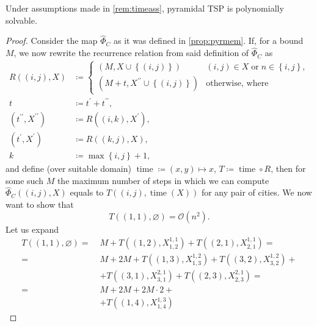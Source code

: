 \documentclass[titlepage,twoside,index=totoc,bibliography=totoc]{scrartcl}
\numberwithin{equation}{section}
\numberwithin{figure}{section}
\numberwithin{table}{section}
\begin{document}
\begin{corollary}
\label{cor:pyrtime}
  Under assumptions made in \cref{rem:timeass},
  pyramidal TSP is polynomially solvable.
\end{corollary}
\begin{proof}
  Consider the map $\widehat{\Phi}_C$ as it was defined in \cref{prop:pyrmem}.
  If, for a bound $M$, we now rewrite the recurrence relation from
  said definition of $\widehat{\Phi}_C$ as
  \begin{align}
    \label{eq:pyrtime}
    R\left((i,j),X\right) & \coloneqq
    \begin{cases}
      \left(M,X \cup \left\{(i,j)\right\}\right) & (i,j) \in X \;\text{or}\; n \in \left\{i,j\right\},
      \\
      \left(M+t,X^{\prime\prime} \cup \left\{(i,j)\right\}\right) & \text{otherwise, where}
    \end{cases}
    \\
    t & \coloneqq t^{\prime} + t^{\prime\prime},
    \nonumber
    \\
    \left(t^{\prime\prime},X^{\prime\prime}\right) & \coloneqq R\left((i,k),X^\prime\right),
    \nonumber
    \\
    \left(t^{\prime},X^{\prime}\right) & \coloneqq R\left((k,j),X\right),
    \nonumber
    \\
    k & \coloneqq \max \left\{i,j\right\} + 1,
    \nonumber
  \end{align}
  and define (over suitable domain)
  $\operatorname{time} \coloneqq (x,y) \mapsto x$,
  $T \coloneqq \operatorname{time} \circ R$,
  then for some such $M$
  the maximum number of steps in which we can compute
  $\widehat{\Phi}_C\left((i,j),X\right)$
  equals to
  $T\left((i,j),\operatorname{time}\left(X\right)\right)$
  for any pair of cities.
  We now want to show that
  \[
    T\left((1,1),\varnothing\right) = \mathcal{O}\left(n^2\right).
  \]
  Let us expand
  \begin{align*}
    T\left((1,1),\varnothing\right) =\; &
    M + T\left((1,2),X_{1,2}^{1,1}\right)
      + T\left((2,1),X_{2,1}^{1,1}\right) =
    \\ =\; & M + 2M + T\left((1,3),X_{1,3}^{1,2}\right)
                  + T\left((3,2),X_{3,2}^{1,2}\right) +
             \\ & + T\left((3,1),X_{3,1}^{2,1}\right)
                  + T\left((2,3),X_{2,3}^{2,1}\right) =
    \\ =\; & M + 2M + 2M\cdot 2 +
    \\ & + T\left((1,4),X_{1,4}^{1,3}\right)

\end{align*}
\end{proof}
\end{document}
